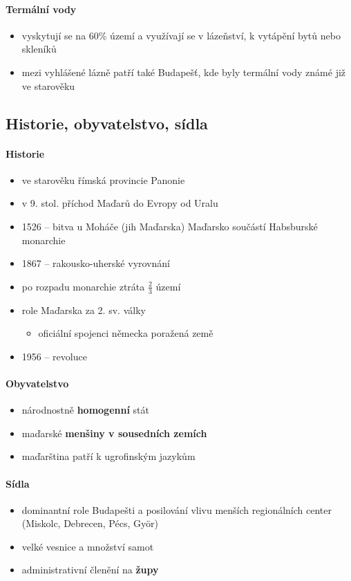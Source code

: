 \paragraph{Termální vody}
\begin{itemize}
\item vyskytují se na 60\% území a využívají se v lázeňství, k vytápění bytů nebo skleníků
\item mezi vyhlášené lázně patří také Budapešť, kde byly termální vody známé již ve starověku
\end{itemize}

\subsection{Historie, obyvatelstvo, sídla}
\paragraph{Historie}
\begin{itemize}
\item ve starověku římská provincie Panonie
\item v 9. stol. příchod Maďarů do Evropy od Uralu
\item 1526 -- bitva u Moháče (jih Maďarska) \ra Maďarsko součástí Habsburské monarchie
\item 1867 -- rakousko-uherské vyrovnání
\item po rozpadu monarchie ztráta $\frac{2}{3}$ území
\item role Maďarska za 2. sv. války
	\begin{itemize}
	\item oficiální spojenci německa \ra poražená země
	\end{itemize}
	\item 1956 -- revoluce
\end{itemize}

\paragraph{Obyvatelstvo}
\begin{itemize}
\item národnostně \textbf{homogenní} stát
\item maďarské \textbf{menšiny v sousedních zemích}
\item maďarština patří k ugrofinským jazykům
\end{itemize}

\paragraph{Sídla}
\begin{itemize}
\item dominantní role Budapešti a posilování vlivu menších regionálních center (Miskolc, Debrecen, Pécs, Györ)
\item velké vesnice a množství samot
\item administrativní členění na \textbf{župy}
\end{itemize}

